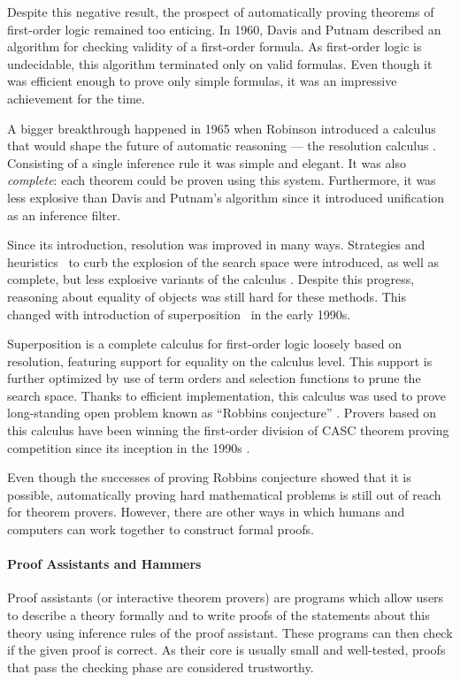 Despite this negative result, the prospect of automatically proving theorems of
first-order logic remained too enticing. In 1960, Davis and Putnam
\cite{dp-1960-dpll} described an algorithm for checking validity of a
first-order formula. As first-order logic is undecidable, this algorithm
terminated only on valid formulas. Even though it was efficient enough to prove
only simple formulas, it was an impressive achievement for the time.

A bigger breakthrough happened in 1965 when Robinson introduced a calculus that
would shape the future of automatic reasoning --- the resolution calculus
\cite{ar-65-resolution}. Consisting of a single inference rule it was simple and
elegant. It was also \emph{complete}: each theorem could be proven using this
system. Furthermore, it was less explosive than Davis and Putnam's algorithm
since it introduced unification as an inference filter.

Since its introduction, resolution was improved in many ways. Strategies and
heuristics~\cite{lw-65-sos} to curb the explosion of the search space were
introduced, as well as complete, but less explosive variants of the calculus
\cite{cc-73-resolution-book}. Despite this progress, reasoning about equality of
objects was still hard for these methods. This changed with introduction of
superposition~\cite{bg-94-superposition} in the early 1990s.

Superposition is a complete calculus for first-order logic loosely based on
resolution, featuring support for equality on the calculus level. This support
is further optimized by use of term orders and selection functions to prune the
search space. Thanks to efficient implementation, this calculus was used to
prove long-standing open problem known as ``Robbins conjecture''
\cite{mccune-97-robbins}. Provers based on this calculus have been
winning the first-order division of CASC theorem proving competition since its
inception in the 1990s \cite{ss-96-casc}.

Even though the successes of proving Robbins conjecture showed that it is
possible, automatically proving hard mathematical problems is still out of reach
for theorem provers. However, there are other ways in which humans and computers can work together to construct formal
proofs.

\paragraph{Proof Assistants and Hammers} Proof assistants (or interactive
theorem provers) are programs which allow users to describe a theory formally
and to write proofs of the statements about this theory using inference 
rules of the proof assistant. These programs can then check if the given proof
is correct. As their core is usually small and well-tested, proofs that pass the
checking phase are considered trustworthy.

